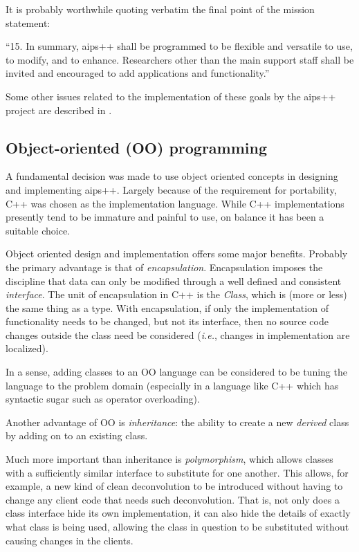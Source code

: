 It is probably worthwhile quoting verbatim the final point of the
mission statement:

``15. In summary, {\sc aips++} shall be programmed to be flexible and
versatile to use, to modify, and to enhance.  Researchers other than
the main support staff shall be invited and encouraged to add
applications and functionality.''

Some other issues related to the implementation of these goals by the
{\sc aips++} project are described in \cite{sn:strategic}.

\subsection{Object-oriented (OO) programming}

A fundamental decision was made to use object oriented concepts in
designing and implementing {\sc aips++}. Largely because of the
requirement for portability, C++ was chosen as the implementation
language. While C++ implementations presently tend to be immature and
painful to use, on balance it has been a suitable choice.

Object oriented design and implementation offers some major benefits.
Probably the primary advantage is that of {\em encapsulation}.
Encapsulation imposes the discipline that data can only be modified
through a well defined and consistent {\em interface}. The unit of
encapsulation in C++ is the {\em Class}, which is (more or less) the
same thing as a type. With encapsulation, if only the implementation
of functionality needs to be changed, but not its interface, then no
source code changes outside the class need be considered ({\em i.e.},
changes in implementation are localized).

In a sense, adding classes to an OO language can be considered to be
tuning the language to the problem domain  (especially in a language
like C++ which has syntactic sugar such as operator overloading).

Another advantage of OO is {\em inheritance}: the ability to create a
new {\em derived} class by adding on to an existing class.

Much more important than inheritance is {\em polymorphism}, which allows
classes with a sufficiently similar interface to substitute for one
another. This allows, for example, a new kind of clean deconvolution
to be introduced without having to change any client code that needs
such deconvolution. That is, not only does a class interface hide its
own implementation, it can also hide the details of exactly what class
is being used, allowing the class in question to be substituted
without causing changes in the clients.

